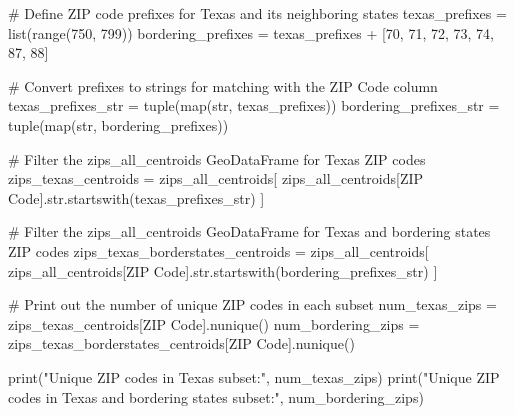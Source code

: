 \documentclass[
  letterpaper,
  DIV=11,
  numbers=noendperiod]{scrartcl}
\newenvironment{Shaded}{\begin{snugshade}}{\end{snugshade}}
\newcommand{\BuiltInTok}[1]{\textcolor[rgb]{0.00,0.23,0.31}{#1}}
\newcommand{\CommentTok}[1]{\textcolor[rgb]{0.37,0.37,0.37}{#1}}
\newcommand{\DecValTok}[1]{\textcolor[rgb]{0.68,0.00,0.00}{#1}}
\newcommand{\NormalTok}[1]{\textcolor[rgb]{0.00,0.23,0.31}{#1}}
\newcommand{\OperatorTok}[1]{\textcolor[rgb]{0.37,0.37,0.37}{#1}}
\newcommand{\StringTok}[1]{\textcolor[rgb]{0.13,0.47,0.30}{#1}}
\begin{document}
\begin{Shaded}
\begin{Highlighting}[]
\CommentTok{\# Define ZIP code prefixes for Texas and its neighboring states}
\NormalTok{texas\_prefixes }\OperatorTok{=} \BuiltInTok{list}\NormalTok{(}\BuiltInTok{range}\NormalTok{(}\DecValTok{750}\NormalTok{, }\DecValTok{799}\NormalTok{))}
\NormalTok{bordering\_prefixes }\OperatorTok{=}\NormalTok{ texas\_prefixes }\OperatorTok{+}\NormalTok{ [}\DecValTok{70}\NormalTok{, }\DecValTok{71}\NormalTok{, }\DecValTok{72}\NormalTok{, }\DecValTok{73}\NormalTok{, }\DecValTok{74}\NormalTok{, }\DecValTok{87}\NormalTok{, }\DecValTok{88}\NormalTok{]}

\CommentTok{\# Convert prefixes to strings for matching with the \textquotesingle{}ZIP Code\textquotesingle{} column}
\NormalTok{texas\_prefixes\_str }\OperatorTok{=} \BuiltInTok{tuple}\NormalTok{(}\BuiltInTok{map}\NormalTok{(}\BuiltInTok{str}\NormalTok{, texas\_prefixes))}
\NormalTok{bordering\_prefixes\_str }\OperatorTok{=} \BuiltInTok{tuple}\NormalTok{(}\BuiltInTok{map}\NormalTok{(}\BuiltInTok{str}\NormalTok{, bordering\_prefixes))}

\CommentTok{\# Filter the zips\_all\_centroids GeoDataFrame for Texas ZIP codes}
\NormalTok{zips\_texas\_centroids }\OperatorTok{=}\NormalTok{ zips\_all\_centroids[}
\NormalTok{    zips\_all\_centroids[}\StringTok{\textquotesingle{}ZIP Code\textquotesingle{}}\NormalTok{].}\BuiltInTok{str}\NormalTok{.startswith(texas\_prefixes\_str)}
\NormalTok{]}

\CommentTok{\# Filter the zips\_all\_centroids GeoDataFrame for Texas and bordering states ZIP codes}
\NormalTok{zips\_texas\_borderstates\_centroids }\OperatorTok{=}\NormalTok{ zips\_all\_centroids[}
\NormalTok{    zips\_all\_centroids[}\StringTok{\textquotesingle{}ZIP Code\textquotesingle{}}\NormalTok{].}\BuiltInTok{str}\NormalTok{.startswith(bordering\_prefixes\_str)}
\NormalTok{]}

\CommentTok{\# Print out the number of unique ZIP codes in each subset}
\NormalTok{num\_texas\_zips }\OperatorTok{=}\NormalTok{ zips\_texas\_centroids[}\StringTok{\textquotesingle{}ZIP Code\textquotesingle{}}\NormalTok{].nunique()}
\NormalTok{num\_bordering\_zips }\OperatorTok{=}\NormalTok{ zips\_texas\_borderstates\_centroids[}\StringTok{\textquotesingle{}ZIP Code\textquotesingle{}}\NormalTok{].nunique()}

\BuiltInTok{print}\NormalTok{(}\StringTok{"Unique ZIP codes in Texas subset:"}\NormalTok{, num\_texas\_zips)}
\BuiltInTok{print}\NormalTok{(}\StringTok{"Unique ZIP codes in Texas and bordering states subset:"}\NormalTok{, num\_bordering\_zips)}
\end{Highlighting}
\end{Shaded}
\end{document}

